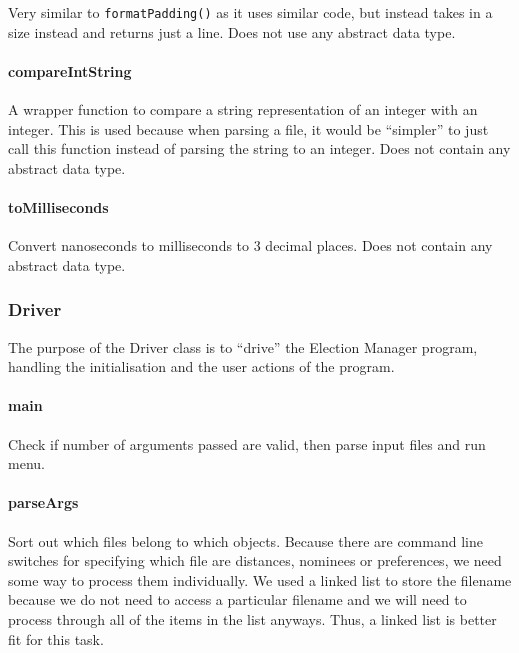 \documentclass[a4paper, 12pt, titlepage]{article}
\newcommand{\code}[1]{\small\texttt{#1}\normalsize}
\begin{document}
Very similar to \code{formatPadding()} as it uses similar code, but instead
takes in a size instead and returns just a line. Does not use any abstract
data type.

\paragraph{compareIntString} \hspace{0pt}

A wrapper function to compare a string representation of an integer with
an integer. This is used because when parsing a file, it would be ``simpler''
to just call this function instead of parsing the string to an integer.
Does not contain any abstract data type.

\paragraph{toMilliseconds} \hspace{0pt}

Convert nanoseconds to milliseconds to 3 decimal places. Does not contain
any abstract data type.

\newpage

\subsubsection{Driver}

The purpose of the Driver class is to ``drive'' the Election Manager program,
handling the initialisation and the user actions of the program.

\paragraph{main} \hspace{0pt}

Check if number of arguments passed are valid, then parse input files and
run menu.

\paragraph{parseArgs} \hspace{0pt}

Sort out which files belong to which objects. Because there are command line
switches for specifying which file are distances, nominees or preferences,
we need some way to process them individually. We used a linked list to
store the filename because we do not need to access a particular filename
and we will need to process through all of the items in the list anyways.
Thus, a linked list is better fit for this task.
\end{document}
